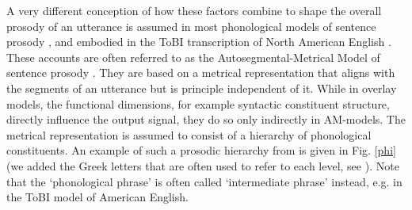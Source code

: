 \documentclass[preprint,review,12pt,authoryear,times]{elsarticle}
\begin{document}
A very different conception of how these factors combine to shape the overall prosody of an utterance is assumed in most phonological models of sentence prosody \citep[e.g.][]{pierr80,ladd80,selki84}, and embodied in the ToBI transcription of North American English \citep{beckm97,beckm05}. These accounts are often referred to as the Autosegmental-Metrical Model of sentence prosody  \citep[`AM-Model', cf.][]{ladd08}. They are based on a metrical representation that aligns with the segments of an utterance but is principle independent of it. While in overlay models, the functional dimensions, for example syntactic constituent structure, directly influence the output signal, they do so only indirectly in AM-models. The metrical representation is assumed to consist of a hierarchy of phonological constituents. An example of such a  prosodic hierarchy from  \citet[384]{selki86} is given in Fig. \ref{phi} (we added the Greek letters that are often used to refer to each level, see \citealt{fery13}). Note that the `phonological phrase' is often called `intermediate phrase' instead, e.g. in the ToBI model of American English.
\end{document}
